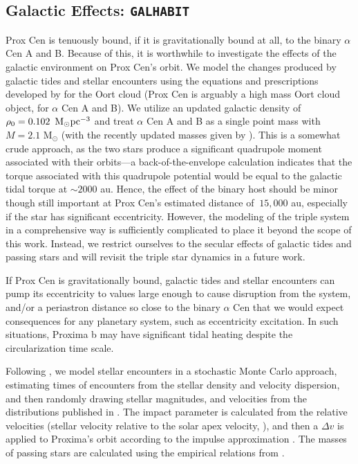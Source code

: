 \documentclass[preprint,12pt]{aastex}
\def\msun{{\rm\,M_\odot}}
\def\galhabit{\texttt{\footnotesize{GALHABIT}}\xspace}
\begin{document}
\subsection{Galactic Effects: \galhabit}
\label{sec:models:galhabit}
Prox Cen is tenuously bound, if it is gravitationally bound at all, to 
the binary $\alpha$ Cen A and B. Because of this, it is worthwhile
to investigate the effects of the galactic environment on 
Prox Cen's orbit. We model the changes produced by galactic tides 
and stellar encounters using the equations and prescriptions 
developed by \cite{Heisler1986, Heisler1987, Rickman2008} 
for the Oort cloud (Prox Cen is arguably a high mass Oort cloud 
object, for $\alpha$ Cen A and B). We utilize an updated galactic 
density of $\rho_0 = 0.102~\msun \rm{pc}^{-3}$ \citep{Holmberg2000} and treat 
$\alpha$ Cen A and B as a single point mass with $M = 2.1$ 
M$_{\odot}$ (with the recently updated masses given by 
\cite{PourbaixBoffin16}). This is a somewhat crude approach, as 
the two stars produce a significant quadrupole moment associated 
with their orbits---a back-of-the-envelope calculation indicates
that the torque associated with this quadrupole potential would 
be equal to the galactic tidal torque at $\sim 2000$ au. Hence, 
the effect of the binary host should be minor though still important 
at Prox Cen's estimated distance of $~15,000$ au, especially if 
the star has significant eccentricity. However, the modeling of the 
triple system in a comprehensive way is sufficiently complicated
\citep[see, i.e.][]{Harrington1968, Ford2000} to place it beyond 
the scope of this work. Instead, we restrict ourselves to the 
secular effects of galactic tides and passing stars 
and will revisit the triple star dynamics in a future work. 

If Prox Cen is gravitationally bound, galactic tides and stellar 
encounters can pump its eccentricity to values large enough to 
cause disruption from the system, and/or a periastron distance 
so close to the binary $\alpha$ Cen that we would expect 
consequences for any planetary system, such as eccentricity 
excitation. In such situations, Proxima b may have significant tidal 
heating despite the circularization time scale. 

Following \cite{Heisler1987,Rickman2008}, we model stellar
encounters in a stochastic Monte Carlo approach, estimating times 
of encounters from the stellar density and velocity dispersion, 
and then randomly drawing stellar magnitudes, and velocities 
from the distributions published in \cite{Garciasanchez2001}. 
The impact parameter is calculated from the relative 
velocities (stellar velocity relative to the solar apex velocity, 
\cite[see][]{Rickman2008}), and then a $\Delta v$ is applied to
Proxima's orbit according to the impulse approximation
\citep{Remy1985}. The masses of passing stars are calculated 
using the empirical relations from \cite{Reid2002}.
\end{document}
